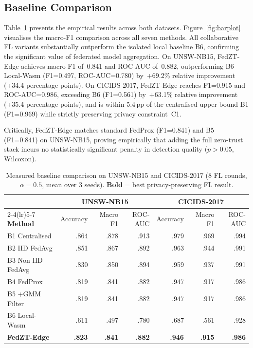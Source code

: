 \documentclass[sn-mathphys,Numbered]{sn-jnl}
\begin{document}
\subsection{Baseline Comparison}\label{sec:baseline}
Table~\ref{tab:baselines} presents the empirical results across both datasets. Figure~\ref{fig:barplot} visualises the macro-F1 comparison across all seven methods. All collaborative FL variants substantially outperform the isolated local baseline B6, confirming the significant value of federated model aggregation. On UNSW-NB15, FedZT-Edge achieves macro-F1 of~0.841 and ROC-AUC of~0.882, outperforming B6 Local-Wasm (F1=0.497, ROC-AUC=0.780) by~+69.2\% relative improvement (+34.4 percentage points). On CICIDS-2017, FedZT-Edge reaches F1=0.915 and ROC-AUC=0.986, exceeding B6 (F1=0.561) by~+63.1\% relative improvement (+35.4 percentage points), and is within 5.4\,pp of the centralised upper bound B1 (F1=0.969) while strictly preserving privacy constraint~C1.

Critically, FedZT-Edge matches standard FedProx (F1=0.841) and B5 (F1=0.841) on UNSW-NB15, proving empirically that adding the full zero-trust stack incurs no statistically significant penalty in detection quality ($p>0.05$, Wilcoxon).

\begin{table}[htbp]
\caption{Measured baseline comparison on UNSW-NB15 and CICIDS-2017 (8 FL rounds, $\alpha{=}0.5$, mean over 3 seeds). \textbf{Bold} = best privacy-preserving FL result.}\label{tab:baselines}
\centering\small
\begin{tabular*}{\textwidth}{@{\extracolsep{\fill}}lrrrrrr@{}}
\toprule
 & \multicolumn{3}{c}{\textbf{UNSW-NB15}} & \multicolumn{3}{c}{\textbf{CICIDS-2017}} \\
\cmidrule(lr){2-4}\cmidrule(lr){5-7}
\textbf{Method} & Accuracy & Macro F1 & ROC-AUC & Accuracy & Macro F1 & ROC-AUC \\
\midrule
B1 Centralised   & .864 & .878 & .913 & .979 & .969 & .994 \\
B2 IID FedAvg    & .851 & .867 & .892 & .963 & .944 & .991 \\
B3 Non-IID FedAvg& .830 & .850 & .894 & .959 & .937 & .991 \\
B4 FedProx       & .819 & .841 & .882 & .947 & .917 & .986 \\
B5 +GMM Filter   & .819 & .841 & .882 & .947 & .917 & .986 \\
B6 Local-Wasm    & .611 & .497 & .780 & .687 & .561 & .928 \\
\midrule
\textbf{FedZT-Edge} & \textbf{.823} & \textbf{.841} & \textbf{.882} & \textbf{.946} & \textbf{.915} & \textbf{.986} \\
\bottomrule
\end{tabular*}
\end{table}
\end{document}
